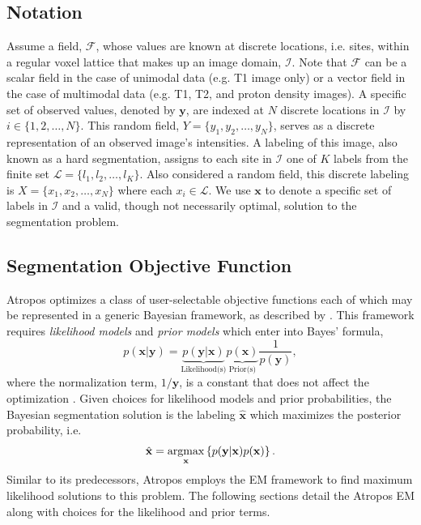 \documentclass[11pt,english]{article}
\newcommand{\argmax}{\operatornamewithlimits{argmax}}
\begin{document}
\subsection{Notation}
Assume a field, $\mathcal{F}$, whose values are known at discrete
locations, i.e. sites, within a regular voxel lattice that makes up an
image domain, $\mathcal{I}$.  Note that $\mathcal{F}$ can be a scalar
field in the case of unimodal data (e.g. T1 image only) or a vector
field in the case of multimodal data (e.g. T1, T2, and proton density
images).  A specific set of observed values, denoted by $\mathbf{y}$,
are indexed at $N$ discrete locations in $\mathcal{I}$ by $i \in \{1,
2, \ldots, N\}$.  This random field, $Y = \{y_1, y_2, \ldots, y_N \}$,
serves as a discrete representation of an observed image's intensities.  A labeling
of this image, also known as a hard segmentation, assigns to each site
in $\mathcal{I}$ one of $K$ labels from the finite set $\mathcal{L} =
\{l_1, l_2, \ldots, l_K\}$.  Also considered a random field, this
discrete labeling is $X = \{x_1, x_2, \ldots, x_N\}$ where each
$x_i \in \mathcal{L}$.   We use $\mathbf{x}$ to denote a specific set of labels in
$\mathcal{I}$ and a valid, though not necessarily optimal, solution to the segmentation problem.


\subsection{Segmentation Objective Function}

 Atropos optimizes a class
of user-selectable objective functions each of which may
be represented in a generic Bayesian framework, as described by \cite{Sanjay-Gopal1998}.  This framework
requires {\em likelihood models} and {\em prior models} which enter
into Bayes' formula,
\begin{equation}\label{eq:bayes}
p(\mathbf{x}|\mathbf{y})=\underbrace{
p(\mathbf{y}|\mathbf{x})}_{\text{Likelihood(s)}} \underbrace{
p(\mathbf{x})}_{\text{Prior(s)}}\frac{1}{p(\mathbf{y})}, 
\end{equation} 
where the normalization term, $1/\mathbf{y}$, is a constant that does
not affect the optimization \citep{Sanjay-Gopal1998}.
Given choices for likelihood models and prior probabilities, the Bayesian
segmentation solution is the labeling $\hat{\mathbf{x}}$ which
maximizes the posterior probability, i.e.
\begin{align} \hat{\mathbf{x}} = \argmax_{\mathbf{x}}
\left\{p(\mathbf{y}|\mathbf{x})p(\mathbf{x})\right\}.
\end{align} Similar to its predecessors, Atropos employs
the EM framework \citep{Dempster1977} to find maximum likelihood
solutions to this problem.  The following sections detail the 
Atropos EM along with choices for the likelihood and prior terms.  
\end{document}
